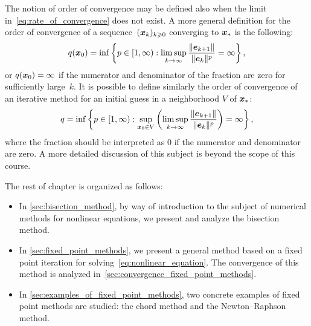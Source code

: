 \begin{remark}
    The notion of order of convergence may be defined also when
    the limit in~\eqref{eq:rate_of_convergence} does not exist.
    A more general definition for the order of convergence of a sequence~$(\mathbf{\boldsymbol{x}}_k)_{k\geqslant0}$ converging to $\mathbf{\boldsymbol{x}}_*$ is the following:
    \[
        q(\mathbf{\boldsymbol{x}}_0) = \inf \left\{ p \in [1, \infty) : \limsup_{k \to \infty} \frac{\lVert\mathbf{\boldsymbol{e}}_{k+1}\rVert}{\lVert\mathbf{\boldsymbol{e}}_k\rVert^p} = \infty \right\},
    \]
    or $q(\mathbf{\boldsymbol{x}}_0) = \infty$ if the numerator and denominator of the fraction are zero for sufficiently large~$k$.
    It is possible to define similarly the order of convergence of an iterative method
    for an initial guess in a neighborhood $V$ of $\mathbf{\boldsymbol{x}}_*$:
    \[
        q = \inf \left\{ p \in [1, \infty) : \sup_{\mathbf{\boldsymbol{x}}_0 \in V} \left( \limsup_{k \to \infty} \frac{\lVert\mathbf{\boldsymbol{e}}_{k+1}\rVert}{\lVert\mathbf{\boldsymbol{e}}_k\rVert^p} \right) = \infty \right\},
    \]
    where the fraction should be interpreted as 0 if the numerator and denominator are zero.
    A more detailed discussion of this subject is beyond the scope of this course.
\end{remark}

The rest of chapter is organized as follows:
\begin{itemize}
    \item
        In \cref{sec:bisection_method},
        by way of introduction to the subject of numerical methods for nonlinear equations,
        we present and analyze the bisection method.

    \item
        In \cref{sec:fixed_point_methods},
        we present a general method based on a fixed point iteration for solving~\eqref{eq:nonlinear_equation}.
        The convergence of this method is analyzed in~\cref{sec:convergence_fixed_point_methods}.

    \item
        In \cref{sec:examples_of_fixed_point_methods},
        two concrete examples of fixed point methods are studied:
        the chord method and the Newton--Raphson method.
\end{itemize}

